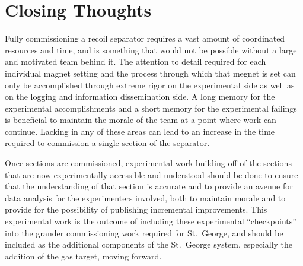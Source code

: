 \section{Closing Thoughts}
\label{sec:closing-thoughts}

Fully commissioning a recoil separator requires a vast amount of coordinated
resources and time, and is something that would not be possible without a large
and motivated team behind it. The attention to detail required for each
individual magnet setting and the process through which that megnet is set can
only be accomplished through extreme rigor on the experimental side as well as
on the logging and information dissemination side. A long memory for the
experimental accomplishments and a short memory for the experimental failings
is beneficial to maintain the morale of the team at a point where work can
continue. Lacking in any of these areas can lead to an increase in the time
required to commission a single section of the separator.

Once sections are commissioned, experimental work building off of the sections
that are now experimentally accessible and understood should be done to ensure
that the understanding of that section is accurate and to provide an avenue for
data analysis for the experimenters involved, both to maintain morale and to
provide for the possibility of publishing incremental improvements. This
experimental work is the outcome of including these experimental
``checkpoints'' into the grander commissioning work required for St.\ George,
and should be included as the additional components of the St.\ George system,
especially the addition of the gas target, moving forward.
